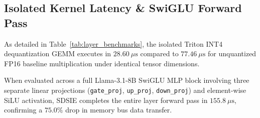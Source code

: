 \documentclass[10pt,journal,compsoc,twocolumn]{IEEEtran}
\begin{document}
\begin{table}[t]
\caption{Layer Latency and Bandwidth on RTX 5090 Blackwell.}
\label{tab:layer_benchmarks}
\centering
{}
\end{table}

\subsection{Isolated Kernel Latency \& SwiGLU Forward Pass}
As detailed in Table~\ref{tab:layer_benchmarks}, the isolated Triton INT4 dequantization GEMM executes in $28.60\ \mu\text{s}$ compared to $77.46\ \mu\text{s}$ for unquantized FP16 baseline multiplication under identical tensor dimensions. 

When evaluated across a full Llama-3.1-8B SwiGLU MLP block involving three separate linear projections (\texttt{gate\_proj}, \texttt{up\_proj}, \texttt{down\_proj}) and element-wise SiLU activation, SDSIE completes the entire layer forward pass in $155.8\ \mu\text{s}$, confirming a $75.0\%$ drop in memory bus data transfer.
\end{document}
